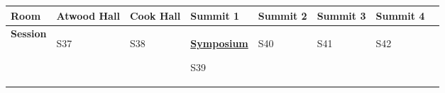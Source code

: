 \begin{tabular}{|x{0.8cm}|x{2.65cm}|x{2.65cm}|a{2.65cm}|y{2.65cm}|x{2.65cm}|x{2.65cm}|@{}m{0pt}@{}}\hline
Room & Atwood Hall & Cook Hall & Summit 1 & Summit 2 & Summit 3 & Summit 4&\\
\hline
\rule{0pt}{1em} \textbf{Session} &\footnotesize \textbf{} \par S37 & \footnotesize \textbf{} \par S38 & \footnotesize \textbf{\underline{Symposium}} \par \textbf{} \par S39 & \footnotesize \textbf{} \par S40 & \footnotesize \textbf{} \par S41 & \footnotesize \textbf{} \par S42&\\[25ex]
\hline

\end{tabular}
